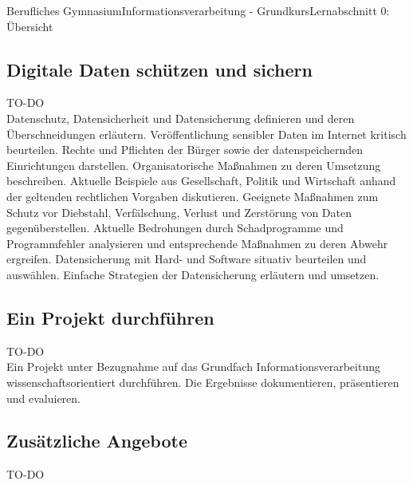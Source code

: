 \documentclass[11pt,oneside,openany,headings=optiontotoc,11pt,numbers=noenddot]{article}
\begin{document}
\begin{worksheet}{Berufliches Gymnasium}{Informationsverarbeitung - Grundkurs}{Lernabschnitt 0: Übersicht}
		\subsection{Digitale Daten schützen und sichern}
		\LARGE{TO-DO}\normalsize\\
		Datenschutz, Datensicherheit und Datensicherung definieren und deren Überschneidungen erläutern.
		Veröffentlichung sensibler Daten im Internet kritisch beurteilen.
		Rechte und Pflichten der Bürger sowie der datenspeichernden Einrichtungen darstellen. Organisatorische
		Maßnahmen zu deren Umsetzung beschreiben. Aktuelle Beispiele aus Gesellschaft,
		Politik und Wirtschaft anhand der geltenden rechtlichen Vorgaben diskutieren.
		Geeignete Maßnahmen zum Schutz vor Diebstahl, Verfälschung, Verlust und Zerstörung von
		Daten gegenüberstellen.
		Aktuelle Bedrohungen durch Schadprogramme und Programmfehler analysieren und entsprechende
		Maßnahmen zu deren Abwehr ergreifen.
		Datensicherung mit Hard- und Software situativ beurteilen und auswählen. Einfache Strategien
		der Datensicherung erläutern und umsetzen.
		\subsection{Ein Projekt durchführen}
		\LARGE{TO-DO}\normalsize\\
		Ein Projekt unter Bezugnahme auf das Grundfach Informationsverarbeitung wissenschaftsorientiert
		durchführen. Die Ergebnisse dokumentieren, präsentieren und evaluieren.
		\subsection*{Zusätzliche Angebote}
		\LARGE{TO-DO}\normalsize\\
	\end{worksheet}
\end{document}
